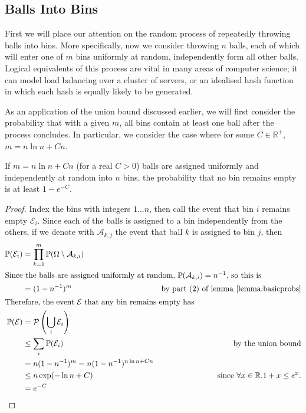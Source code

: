 	\subsection{Balls Into Bins}
		First we will place our attention on the random process of repeatedly throwing balls into bins. More specifically, now we 
		consider throwing $n$ balls, each of which will enter one of $m$ bins uniformly at random, independently form all other balls.
		Logical equivalents of this process are vital in many areas of computer science; it can model load balancing over a cluster of
		servers, or an idealised hash function in which each hash is equally likely to be generated.

		As an application of the union bound discussed earlier, we will first consider the probability that with a given $m$, all bins
		contain at least one ball after the process concludes. In particular, we consider the case where for some $C \in \mathbb{R}^+$,
		$m = n \ln n + Cn$.
		\begin{claim}
			If $m = n\ln n + Cn$ (for a real $C>0$) balls are assigned uniformly and independently at random into $n$ bins,
			the probability that no bin remains empty is at least $1- e^{-C}$.
		\end{claim}
		\begin{proof}
			Index the bins with integers $1 \hdots n$, then call the event that bin $i$ remains empty $\mathcal{E}_i$. 
			Since each of the balls is assigned to a bin independently from the others, if we denote with $\mathcal{A}_{k,j}$ 
			the event that ball $k$ is assigned to bin $j$, then 
			\begin{align*}
				\mathbb{P}(\mathcal{E}_i) &= \prod_{k=1}^m \mathbb{P}(\Omega \setminus \mathcal{A}_{k, i}) \\
			\intertext{Since the balls are assigned uniformly at random, $\mathbb{P}(\mathcal{A}_{k,i}) = n^{-1}$, so this is}
				                          &= (1 - n^{-1})^m & \text{by part (2) of lemma \ref{lemma:basicprobs}} \\
			\intertext{Therefore, the event $\mathcal{E}$ that any bin remains empty has}
				\mathbb{P}(\mathcal{E})   &= \mathcal{P}\left(\bigcup_{i} \mathcal{E}_i \right) \\
				                          &\leq \sum_i \mathbb{P}(\mathcal{E}_i) &\text{by the union bound}\\
							  &= n (1-n^{-1})^m = n(1-n^{-1})^{n\ln n +Cn} \\
							  &\leq n \exp(-\ln n + C) & \text{since $\forall x \in \mathbb{R}. 1+x \leq e^x$.}\\
							  &= e^{-C} 
			\end{align*}
			\vspace{-1.5em}
		\end{proof}
		
